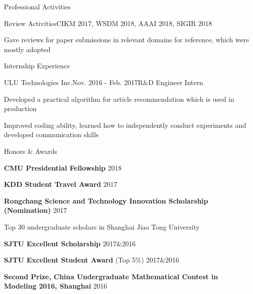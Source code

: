 \documentclass{resume} %
\begin{document}
\vspace{-20pt}
\begin{rSection}{Professional Activities}
\begin{rSubsection}{Review Activities}{CIKM 2017, WSDM 2018, AAAI 2018, SIGIR 2018}{}{}
\item Gave reviews for paper submissions in relevant domains for reference, which were mostly adopted
\end{rSubsection}
\end{rSection}


\begin{rSection}{Internship Experience}
\begin{rSubsection}{ULU Technologies Inc.}{Nov. 2016 - Feb. 2017}{R$\&$D  Engineer Intern}{}
\item Developed a practical algorithm for article recommendation which is used in production 
\item Improved coding ability, learned how to independently conduct experiments and developed communication skills
\end{rSubsection}
\end{rSection}



\begin{rSection}{Honors $\&$ Awards}
\begin{rSubsection}{}{}{}{}
\item[] \textbf{CMU Presidential Fellowship} \hfill{2018}
\item[] \textbf{KDD Student Travel Award} \hfill{2017}
\item[] \textbf{Rongchang Science and Technology Innovation Scholarship (Nomination)} \hfill{2017}
\item Top 30 undergraduate scholars in Shanghai Jiao Tong University
\item[] \textbf{SJTU Excellent Scholarship} \hfill{2017$\&$2016}
\item[] \textbf{SJTU Excellent Student Award} (Top 5\%)  \hfill{2017$\&$2016}
\item[] \textbf{Second Prize, China Undergraduate Mathematical Contest in Modeling 2016, Shanghai} \hfill{2016}
\end{rSubsection}
\end{rSection}
\end{document}
